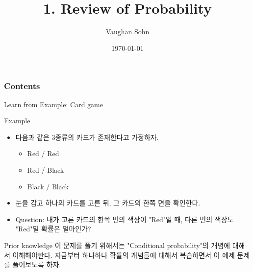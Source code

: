 \documentclass[9pt]{beamer}
\title{1. Review of Probability}
\date{\today}
\author{Vaughan Sohn}
\begin{document}
    \maketitle
    
    \begin{frame}
        \frametitle{Contents}
        \tableofcontents
    \end{frame}

    \begin{section}{Learn from Example: Card game}
      \begin{frame}{Example}
        \begin{itemize}
          \item 다음과 같은 3종류의 카드가 존재한다고 가정하자.
          \begin{itemize}
            \item Red / Red
            \item Red / Black
            \item Black / Black
          \end{itemize}
          \item 눈을 감고 하나의 카드를 고른 뒤, 그 카드의 한쪽 면을 확인한다.
          \item Question: 내가 고른 카드의 한쪽 면의 색상이 "Red"일 때, 다른 면의 색상도 "Red"일 확률은 얼마인가?
        \end{itemize}
        \vspace{1cm}
        
        \begin{alertblock}{Prior knowledge}
        \checkmark 이 문제를 풀기 위해서는 "Conditional probability"의 개념에 대해서 이해해야한다. 지금부터 하나하나 확률의 개념들에 대해서 복습하면서 이 예제 문제를 풀어보도록 하자.
        \end{alertblock}
      \end{frame}
    \end{section}
\end{document}
